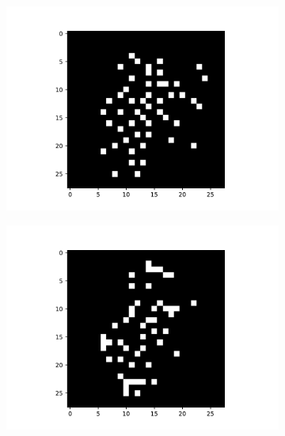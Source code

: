 \documentclass[a4paper,twocolumn]{article} %
\begin{document}
\begin{figure}[h!]
    \begin{subfigure}[t]{0.19\linewidth}
        \includegraphics[width=\linewidth]{figures/best_seed_sa.pdf}
    \end{subfigure}
    \hfill
    \begin{subfigure}[t]{0.19\linewidth}
        \includegraphics[width=\linewidth]{figures/best_seed_lly.pdf}
    \end{subfigure}
    \hfill
    \begin{subfigure}[t]{0.19\linewidth}

\end{subfigure}
\end{figure}
\end{document}
